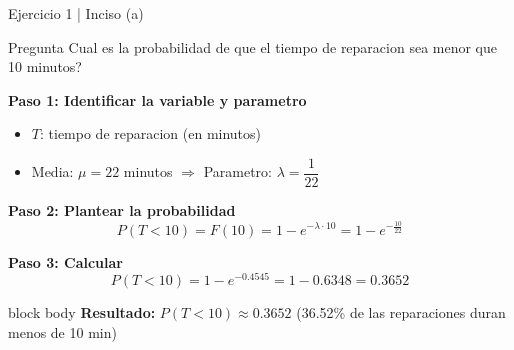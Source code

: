 \documentclass[10pt]{beamer}
\begin{document}
\begin{frame}{Ejercicio 1 | Inciso (a)}
\begin{exampleblock}{Pregunta}
Cual es la probabilidad de que el tiempo de reparacion sea menor que 10 minutos?
\end{exampleblock}

\vspace{0.2cm}
\textbf{Paso 1: Identificar la variable y parametro}
\begin{itemize}
    \item $T$: tiempo de reparacion (en minutos)
    \item Media: $\mu = 22$ minutos $\Rightarrow$ Parametro: $\lambda = \dfrac{1}{22}$
\end{itemize}

\vspace{0.1cm}
\textbf{Paso 2: Plantear la probabilidad}
\[
P(T < 10) = F(10) = 1 - e^{-\lambda \cdot 10} = 1 - e^{-\frac{10}{22}}
\]

\vspace{0.1cm}
\textbf{Paso 3: Calcular}
\[
P(T < 10) = 1 - e^{-0.4545} = 1 - 0.6348 = \boxed{0.3652}
\]

\vspace{0.2cm}
\begin{beamercolorbox}[rounded=true,shadow=true,wd=\linewidth]{block body}
\centering
\textbf{Resultado:} $P(T < 10) \approx 0.3652$ (36.52\% de las reparaciones duran menos de 10 min)
\end{beamercolorbox}
\end{frame}
\end{document}
